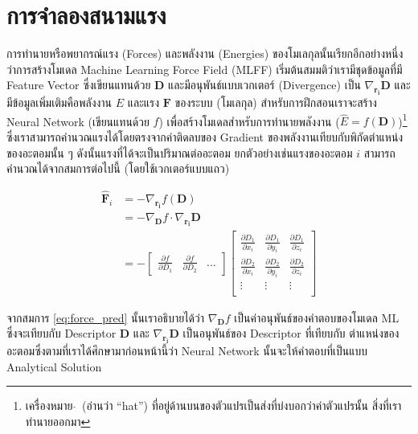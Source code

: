 \section{การจำลองสนามแรง}
\label{sec:model_ff}

การทำนายหรือพยากรณ์แรง (Forces) และพลังงาน (Energies) ของโมเลกุลนั้นเรียกอีกอย่างหนึ่งว่าการสร้างโมเดล Machine Learning 
Force Field (MLFF) เริ่มต้นสมมติว่าเรามีชุดข้อมูลที่มี Feature Vector ซึ่งเขียนแทนด้วย $\mathbf{D}$ และมีอนุพันธ์แบบเวกเตอร์ 
(Divergence) เป็น $\nabla_{\mathbf{r_{i}}} \mathbf{D}$ และมีข้อมูลเพิ่มเติมคือพลังงาน $E$ และแรง $\mathbf{F}$ ของระบบ 
(โมเลกุล) สำหรับการฝึกสอนเราจะสร้าง Neural Network (เขียนแทนด้วย $f$) เพื่อสร้างโมเดลสำหรับการทำนายพลังงาน ($\hat{E} = 
f(\mathbf{D})$)\footnote{เครื่องหมาย $\hat{}$\, (อ่านว่า \enquote{hat}) ที่อยู่ด้านบนของตัวแปรเป็นส่งที่บ่งบอกว่าค่าตัวแปรนั้น%
สิ่งที่เราทำนายออกมา} ซึ่งเราสามารถคำนวณแรงได้โดยตรงจากค่าติดลบของ Gradient ของพลังงานเทียบกับพิกัดตำแหน่งของอะตอมนั้น ๆ 
ดังนั้นแรงที่ได้จะเป็นปริมาณต่ออะตอม ยกตัวอย่างเช่นแรงของอะตอม $i$ สามารถคำนวณได้จากสมการต่อไปนี้ (โดยใช้เวกเตอร์แบบแถว)

\begin{align}\label{eq:force_pred}
\hat{\mathbf{F}}_i &= - \nabla_{\mathbf{r_{i}}} f(\mathbf{D}) \\
&= - \nabla_{\mathbf{D}} f \cdot \nabla_{\mathbf{r_{i}}} \mathbf{D}\\
&= - \begin{bmatrix}
    \frac{\partial f}{\partial D_1} & \frac{\partial f}{\partial D_2} & \dots
\end{bmatrix}
\begin{bmatrix}
    \frac{\partial D_1}{\partial x_{i}} & \frac{\partial D_1}{\partial y_i} & \frac{\partial D_1}{\partial z_i}\\
    \frac{\partial D_2}{\partial x_{i}} & \frac{\partial D_2}{\partial y_i} & \frac{\partial D_2}{\partial z_i}\\
    \vdots & \vdots & \vdots \\
\end{bmatrix}
\end{align}

\noindent จากสมการ \ref{eq:force_pred} นั้นเราอธิบายได้ว่า $\nabla_{\mathbf{D}} f$ เป็นค่าอนุพันธ์ของคำตอบของโมเดล ML 
ซึ่งจะเทียบกับ Descriptor $\mathbf{D}$ และ $\nabla_{\mathbf{r_{i}}} \mathbf{D}$ เป็นอนุพันธ์ของ Descriptor ที่เทียบกับ%
ตำแหน่งของอะตอมซึ่งตามที่เราได้ศึกษามาก่อนหน้านี้ว่า Neural Network นั้นจะให้คำตอบที่เป็นแบบ Analytical Solution

